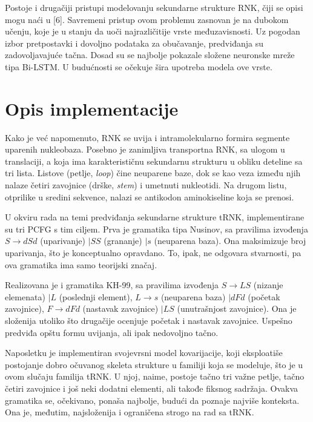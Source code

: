 \documentclass[a4paper, 12pt]{article}
\begin{document}
Postoje i drugačiji pristupi modelovanju sekundarne strukture RNK, čiji se opisi mogu naći u [6]. Savremeni pristup ovom problemu zasnovan je na dubokom učenju, koje je u stanju da uoči najrazličitije vrste međuzavisnosti. Uz pogodan izbor pretpostavki i dovoljno podataka za obučavanje, predviđanja su zadovoljavajuće tačna. Dosad su se najbolje pokazale složene neuronske mreže tipa Bi-LSTM. U budućnosti se očekuje šira upotreba modela ove vrste.

\section{Opis implementacije}

Kako je već napomenuto, RNK se uvija i intramolekularno formira segmente uparenih nukleobaza. Posebno je zanimljiva transportna RNK, sa ulogom u translaciji, a koja ima karakterističnu sekundarnu strukturu u obliku deteline sa tri lista. Listove (petlje, \textit{loop}) čine neuparene baze, dok se kao veza između njih nalaze četiri zavojnice (drške, \textit{stem}) i umetnuti nukleotidi. Na drugom listu, otprilike u sredini sekvence, nalazi se antikodon aminokiseline koja se prenosi.

U okviru rada na temi predviđanja sekundarne strukture tRNK, implementirane su tri PCFG s tim ciljem. Prva je gramatika tipa Nusinov, sa pravilima izvođenja $S \rightarrow dSd$ (uparivanje) $| SS$ (grananje) $| s$ (neuparena baza). Ona maksimizuje broj uparivanja, što je konceptualno opravdano. To, ipak, ne odgovara stvarnosti, pa ova gramatika ima samo teorijski značaj.

Realizovana je i gramatika KH-99, sa pravilima izvođenja $S \rightarrow LS$ (nizanje elemenata) $| L$ (poslednji element), $L \rightarrow s$ (neuparena baza) $| dFd$ (početak zavojnice), $F \rightarrow dFd$ (nastavak zavojnice) $| LS$ (unutrašnjost zavojnice). Ona je složenija utoliko što drugačije ocenjuje početak i nastavak zavojnice. Uspešno predviđa opštu formu uvijanja, ali ipak nedovoljno tačno.

Naposletku je implementiran svojevrsni model kovarijacije, koji eksploatiše postojanje dobro očuvanog skeleta strukture u familiji koja se modeluje, što je u ovom slučaju familija tRNK. U njoj, naime, postoje tačno tri važne petlje, tačno četiri zavojnice i još neki dodatni elementi, ali takođe fiksnog sadržaja. Ovakva gramatika se, očekivano, ponaša najbolje, budući da poznaje najviše konteksta. Ona je, međutim, najsloženija i ograničena strogo na rad sa tRNK.
\end{document}
